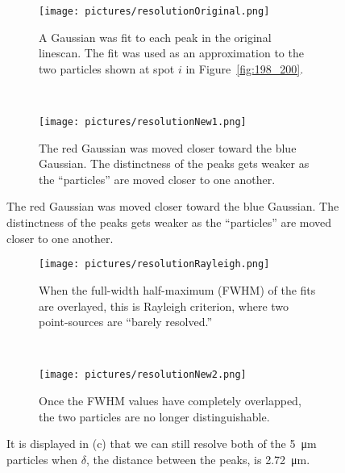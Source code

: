 \begin{figure}[ht!]
    \begin{center}

        \begin{subfigure}[t]{\textwidth}
            \label{fig:linescan_original}
            \texttt{[image: pictures/resolutionOriginal.png]}
            \caption{A Gaussian was fit to each peak in the original linescan.
                The fit was used as an approximation to the two particles shown
            at spot $i$ in Figure~\ref{fig:198_200}.}
        \end{subfigure}
        \\
        \begin{subfigure}[t]{\textwidth}
            \label{fig:linescan_new1}
            \texttt{[image: pictures/resolutionNew1.png]}
            \caption{The red Gaussian was moved closer toward the blue
            Gaussian. The distinctness of the peaks gets weaker as the
        ``particles'' are moved closer to one another.}
        \end{subfigure}

    \end{center}
\end{figure}

\begin{figure}[ht!]
    \ContinuedFloat
    \begin{center}
        \begin{subfigure}[t]{\textwidth}
            \label{fig:linescan_rayleigh}
            \texttt{[image: pictures/resolutionRayleigh.png]}
            \caption{When the full-width half-maximum (FWHM) of the fits are
            overlayed, this is Rayleigh criterion, where two point-sources are
            ``barely resolved.'' \cite{Goodman}}
        \end{subfigure}
        \\
        \begin{subfigure}[t]{\textwidth}
            \label{fig:linescan_new2}
            \texttt{[image: pictures/resolutionNew2.png]}
            \caption{Once the FWHM values have completely overlapped, the two
            particles are no longer distinguishable.}
        \end{subfigure}

    \end{center}
    \caption{%
        It is displayed in (c) that we can still resolve both of the
        \SI{5}{\micro\meter} particles when $\delta$, the distance between the
        peaks, is
        \SI{2.72}{\micro\meter}.
    }%
    \label{fig:linescan}

\end{figure}


